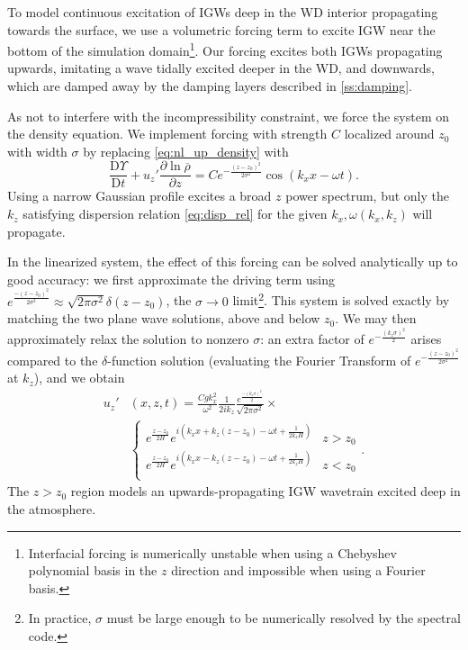 \documentclass[
        fleqn,
        usenatbib,
    ]{mnras}
\newcommand*{\pd}[2]{\frac{\partial#1}{\partial#2}}
\newcommand*{\md}[2]{\frac{\mathrm{D}#1}{\mathrm{D}#2}}
\newcommand*{\p}[1]{\left(#1\right)}
\begin{document}
To model continuous excitation of IGWs deep in the WD interior propagating
towards the surface, we use a volumetric forcing term to excite IGW near the
bottom of the simulation domain\footnote{Interfacial forcing is numerically
unstable when using a Chebyshev polynomial basis in the $z$ direction and
impossible when using a Fourier basis.}. Our forcing excites both IGWs
propagating upwards, imitating a wave tidally excited deeper in the WD, and
downwards, which are damped away by the damping layers described in
\autoref{ss:damping}.

As not to interfere with the incompressibility constraint, we force the system
on the density equation. We implement forcing with strength $C$ localized around
$z_0$ with width $\sigma$ by replacing \autoref{eq:nl_up_density} with
\begin{equation}
    \md{\Upsilon}{t} + u_{z}'\pd{\ln \overline{\rho}}{z}
        = Ce^{-\frac{(z - z_0)^2}{2\sigma^2}}
            \cos \p{k_{x}x - \omega t}.\label{eq:vol_drive}
\end{equation}
Using a narrow Gaussian profile excites a broad $z$ power spectrum, but only the
$k_{z}$ satisfying dispersion relation \autoref{eq:disp_rel} for the given
$k_{x}, \omega(k_{x}, k_{z})$ will propagate.

In the linearized system, the effect of this forcing can be solved analytically
up to good accuracy: we first approximate the driving term using
$e^{\frac{-(z - z_0)^2}{2\sigma^2}} \approx \sqrt{2\pi \sigma^2}\delta(z -
z_0)$, the $\sigma \to 0$ limit\footnote{In practice, $\sigma$ must be large
enough to be numerically resolved by the spectral code.}. This system is solved
exactly by matching the two plane wave solutions, above and below $z_0$. We may
then approximately relax the solution to nonzero $\sigma$: an extra factor of
$e^{-\frac{(k_{z}\sigma)^2}{2}}$ arises compared to the $\delta$-function
solution (evaluating the Fourier Transform of $e^{-\frac{(z -
z_0)^2}{2\sigma^2}}$ at $k_z$), and we obtain
\begin{align}
    u_{z}'&(x, z, t) ={} \frac{Cgk_{x}^2}{\omega^2}
        \frac{1}{2ik_{z}}\frac{e^{\frac{-(k_{z}\sigma)^2}{2}}}
        {\sqrt{2\pi\sigma^2}} \times\nonumber\\
        &{}\begin{cases}
        e^{\frac{z - z_0}{2H}}e^{i\p{k_{x}x + k_{z}(z - z_0) - \omega t
            + \frac{1}{2k_{z}H}}}
            & z > z_0\\
        e^{\frac{z - z_0}{2H}}e^{i\p{k_{x}x - k_{z}(z - z_0) - \omega t
            + \frac{1}{2k_{z}H}}}
            & z < z_0\\
    \end{cases}.\label{eq:uz_lin}
\end{align}
The $z > z_0$ region models an upwards-propagating IGW wavetrain excited deep
in the atmosphere.
\end{document}
